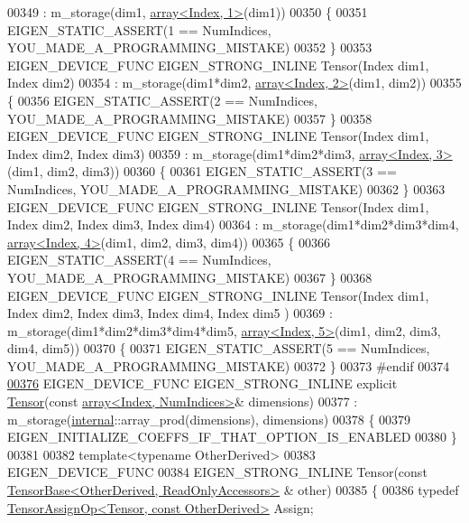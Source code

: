 \begin{DoxyCode}
00349       : m\_storage(dim1, \hyperlink{class_eigen_1_1array}{array<Index, 1>}(dim1))
00350     \{
00351       EIGEN\_STATIC\_ASSERT(1 == NumIndices, YOU\_MADE\_A\_PROGRAMMING\_MISTAKE)
00352     \}
00353     EIGEN\_DEVICE\_FUNC EIGEN\_STRONG\_INLINE Tensor(Index dim1, Index dim2)
00354       : m\_storage(dim1*dim2, \hyperlink{class_eigen_1_1array}{array<Index, 2>}(dim1, dim2))
00355     \{
00356       EIGEN\_STATIC\_ASSERT(2 == NumIndices, YOU\_MADE\_A\_PROGRAMMING\_MISTAKE)
00357     \}
00358     EIGEN\_DEVICE\_FUNC EIGEN\_STRONG\_INLINE Tensor(Index dim1, Index dim2, Index dim3)
00359       : m\_storage(dim1*dim2*dim3, \hyperlink{class_eigen_1_1array}{array<Index, 3>}(dim1, dim2, dim3))
00360     \{
00361       EIGEN\_STATIC\_ASSERT(3 == NumIndices, YOU\_MADE\_A\_PROGRAMMING\_MISTAKE)
00362     \}
00363     EIGEN\_DEVICE\_FUNC EIGEN\_STRONG\_INLINE Tensor(Index dim1, Index dim2, Index dim3, Index dim4)
00364       : m\_storage(dim1*dim2*dim3*dim4, \hyperlink{class_eigen_1_1array}{array<Index, 4>}(dim1, dim2, dim3, dim4))
00365     \{
00366       EIGEN\_STATIC\_ASSERT(4 == NumIndices, YOU\_MADE\_A\_PROGRAMMING\_MISTAKE)
00367     \}
00368     EIGEN\_DEVICE\_FUNC EIGEN\_STRONG\_INLINE Tensor(Index dim1, Index dim2, Index dim3, Index dim4, Index dim5
      )
00369       : m\_storage(dim1*dim2*dim3*dim4*dim5, \hyperlink{class_eigen_1_1array}{array<Index, 5>}(dim1, dim2, dim3, dim4, dim5))
00370     \{
00371       EIGEN\_STATIC\_ASSERT(5 == NumIndices, YOU\_MADE\_A\_PROGRAMMING\_MISTAKE)
00372     \}
00373 \textcolor{preprocessor}{#endif}
00374 
\hyperlink{class_eigen_1_1_tensor_a6ef6b578cd0ca367842b0d8888e22195}{00376}     EIGEN\_DEVICE\_FUNC EIGEN\_STRONG\_INLINE \textcolor{keyword}{explicit} \hyperlink{class_eigen_1_1_tensor_a6ef6b578cd0ca367842b0d8888e22195}{Tensor}(\textcolor{keyword}{const} 
      \hyperlink{class_eigen_1_1array}{array<Index, NumIndices>}& dimensions)
00377         : m\_storage(\hyperlink{namespaceinternal}{internal}::array\_prod(dimensions), dimensions)
00378     \{
00379       EIGEN\_INITIALIZE\_COEFFS\_IF\_THAT\_OPTION\_IS\_ENABLED
00380     \}
00381 
00382     \textcolor{keyword}{template}<\textcolor{keyword}{typename} OtherDerived>
00383     EIGEN\_DEVICE\_FUNC
00384     EIGEN\_STRONG\_INLINE Tensor(\textcolor{keyword}{const} \hyperlink{class_eigen_1_1_tensor_base}{TensorBase<OtherDerived, ReadOnlyAccessors>}
      & other)
00385     \{
00386       \textcolor{keyword}{typedef} \hyperlink{class_eigen_1_1_tensor_assign_op}{TensorAssignOp<Tensor, const OtherDerived>} Assign;

\end{DoxyCode}
